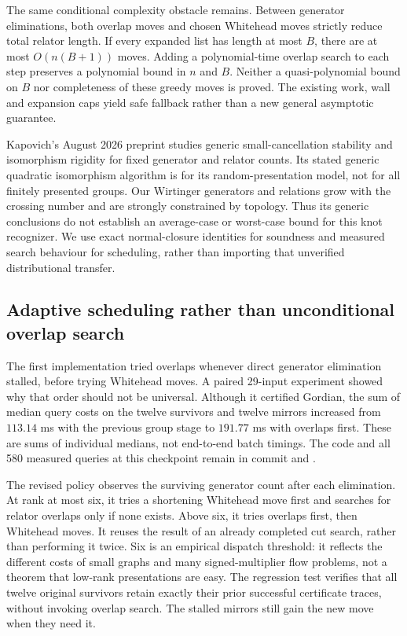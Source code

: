 The same conditional complexity obstacle remains.  Between generator
eliminations, both overlap moves and chosen Whitehead moves strictly
reduce total relator length.  If every expanded list has length at most
$B$, there are at most $O(n(B+1))$ moves.  Adding a polynomial-time overlap
search to each step preserves a polynomial bound in $n$ and $B$.
Neither a quasi-polynomial bound on $B$ nor completeness of these greedy
moves is proved.  The existing work, wall and expansion caps yield safe
fallback rather than a new general asymptotic guarantee.

Kapovich's August 2026 preprint \cite{kapovich-generic} studies generic
small-cancellation stability and isomorphism rigidity for fixed generator
and relator counts.  Its stated generic quadratic isomorphism algorithm
is for its random-presentation model, not for all finitely presented
groups.  Our Wirtinger generators and relations grow with the crossing
number and are strongly constrained by topology.  Thus its generic
conclusions do not establish an average-case or worst-case bound for this
knot recognizer.  We use exact normal-closure identities for soundness and
measured search behaviour for scheduling, rather than importing that
unverified distributional transfer.

\subsection{Adaptive scheduling rather than unconditional overlap search}

The first implementation tried overlaps whenever direct generator
elimination stalled, before trying Whitehead moves.  A paired 29-input
experiment showed why that order should not be universal.  Although it
certified Gordian, the sum of median query costs on the twelve survivors
and twelve mirrors increased from $113.14$ ms with the previous group
stage to $191.77$ ms with overlaps first.  These are sums of individual
medians, not end-to-end batch timings.  The code and all 580 measured
queries at this checkpoint remain in commit  and
.

The revised policy observes the surviving generator count after each
elimination.  At rank at most six, it tries a shortening Whitehead move
first and searches for relator overlaps only if none exists.  Above six,
it tries overlaps first, then Whitehead moves.  It reuses the result of
an already completed cut search, rather than performing it twice.
Six is an empirical dispatch threshold: it reflects the different costs
of small graphs and many signed-multiplier flow problems, not a theorem
that low-rank presentations are easy.  The regression test verifies that
all twelve original survivors retain exactly their prior successful
certificate traces, without invoking overlap search.  The stalled
mirrors still gain the new move when they need it.

